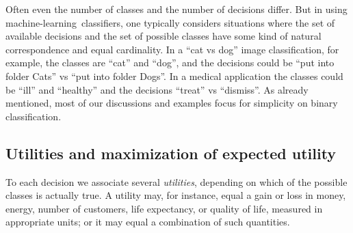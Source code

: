 \documentclass[\ifafour a4paper,12pt,\else a5paper,10pt,\fi%
onecolumn,oneside,article,%
british%
]{memoir}
\theoremstyle{remark}
\theoremstyle{innote}
\renewcommand*{\|}[1][]{\nonscript\:#1\vert\nonscript\:\mathopen{}}
\newcommand*{\ml}{machine-learning}
\begin{document}
Often even the number of classes and the number of decisions differ. But in using \ml\ classifiers, one typically considers situations where the set of available decisions and the set of possible classes have some kind of natural correspondence and equal cardinality. In a \enquote{cat vs dog} image classification, for example, the classes are \enquote{cat} and \enquote{dog}, and the decisions could be \enquote{put into folder Cats} vs \enquote{put into folder Dogs}. In a medical application the classes could be \enquote{ill} and \enquote{healthy} and the decisions \enquote{treat} vs \enquote{dismiss}. As already mentioned,  most of our discussions and examples focus for simplicity on binary classification.


\subsection{Utilities and maximization of expected utility}
\label{sec:dt_utilities}

To each decision we associate several \emph{utilities}, depending on which of the possible classes is actually true. A utility may, for instance, equal a gain or loss in money, energy, number of customers, life expectancy, or quality of life, measured in appropriate units; or it may equal a  combination of such quantities.
\end{document}
